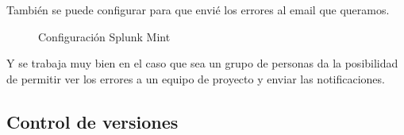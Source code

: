 También se puede configurar para que envié los errores al email que queramos.

\begin{figure}[H] 
  \begin{center} 
    \caption{Configuración  Splunk Mint} 
    \label{fig:ConfiguracionSplunkMint} 
  \end{center} 
\end{figure}

Y se trabaja muy bien en el caso que sea un grupo de personas da la posibilidad de permitir ver los errores a un equipo de proyecto y enviar las notificaciones.

\subsection{Control de versiones}
\label{subsecc:Control de versiones}

